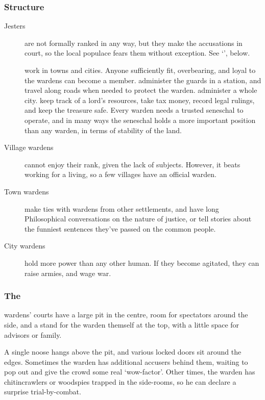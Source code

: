 \begin{multicols}{2}

\subsubsection{Structure}

\begin{description}
  \item[Jesters]
  are not formally ranked in any way, but they make the accusations in court, so the local populace fears them without exception.
  See `', below.
  \item[]
  work in towns and cities.
  Anyone sufficiently fit, overbearing, and loyal to the \glspl{warden} can become a member.
  administer the guards in a station, and travel along roads when needed to protect the \gls{warden}.
  administer a whole city.
  keep track of a lord's resources, take tax money, record legal rulings, and keep the treasure safe.
  Every \gls{warden} needs a trusted seneschal to operate, and in many ways the seneschal holds a more important position than any \gls{warden}, in terms of stability of the land.
  \item[Village \Glspl{warden}]
  cannot enjoy their rank, given the lack of subjects.
  However, it beats working for a living, so a few \glspl{village} have an official \gls{warden}.
  \item[Town \Glspl{warden}]
  make ties with \glspl{warden} from other settlements, and have long Philosophical conversations on the nature of justice, or tell stories about the funniest sentences they've passed on the common people.
  \item[City \Glspl{warden}]
  hold more power than any other human.
  If they become agitated, they can raise armies, and wage war.
\end{description}

\subsubsection{The }
\label{pitOfJustice}

\Glspl{warden}' courts have a large pit in the centre, room for spectators around the side, and a stand for the \gls{warden} themself at the top, with a little space for advisors or family.

A single noose hangs above the pit, and various locked doors sit around the edges.
Sometimes the \gls{warden} has additional accusers behind them, waiting to pop out and give the crowd some real `wow-factor'.
Other times, the \gls{warden} has chitincrawlers or woodspies trapped in the side-rooms, so he can declare a surprise trial-by-combat.


\end{multicols}
